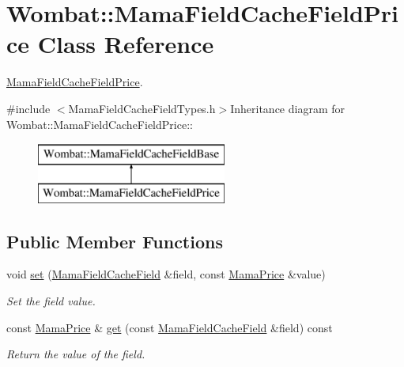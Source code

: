 \hypertarget{classWombat_1_1MamaFieldCacheFieldPrice}{
\section{Wombat::MamaFieldCacheFieldPrice Class Reference}
\label{classWombat_1_1MamaFieldCacheFieldPrice}
}


\hyperlink{classWombat_1_1MamaFieldCacheFieldPrice}{MamaFieldCacheFieldPrice}.  


{\ttfamily \#include $<$MamaFieldCacheFieldTypes.h$>$}Inheritance diagram for Wombat::MamaFieldCacheFieldPrice::\begin{figure}[H]
\begin{center}
\leavevmode
\includegraphics[height=2cm]{classWombat_1_1MamaFieldCacheFieldPrice}
\end{center}
\end{figure}
\subsection*{Public Member Functions}
\begin{DoxyCompactItemize}
\item 
void \hyperlink{classWombat_1_1MamaFieldCacheFieldPrice_a74e6b0899fdf9a2ed77acd16861f37f8}{set} (\hyperlink{classWombat_1_1MamaFieldCacheField}{MamaFieldCacheField} \&field, const \hyperlink{classWombat_1_1MamaPrice}{MamaPrice} \&value)
\begin{DoxyCompactList}\small\item\em Set the field value. \item\end{DoxyCompactList}\item 
const \hyperlink{classWombat_1_1MamaPrice}{MamaPrice} \& \hyperlink{classWombat_1_1MamaFieldCacheFieldPrice_ac49df5226c0b14c2cfd24d827c324248}{get} (const \hyperlink{classWombat_1_1MamaFieldCacheField}{MamaFieldCacheField} \&field) const 
\begin{DoxyCompactList}\small\item\em Return the value of the field. \item\end{DoxyCompactList}\end{DoxyCompactItemize}

